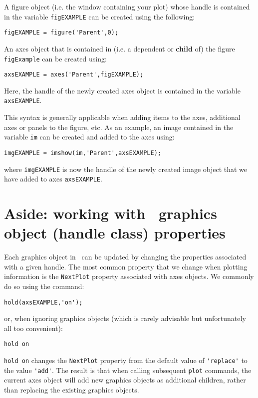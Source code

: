 \documentclass{tufte-handout}
\begin{document}
A figure object (i.e. the window containing your plot) whose handle is contained in the variable \lstinline{figEXAMPLE} can be created using the following:
\begin{lstlisting}[style=usnaMatlab]
figEXAMPLE = figure('Parent',0);
\end{lstlisting}

An axes object that is contained in (i.e. a dependent or \textbf{child} of) the figure \lstinline{figExample} can be created using:
\begin{lstlisting}[style=usnaMatlab]
axsEXAMPLE = axes('Parent',figEXAMPLE);
\end{lstlisting}

Here, the handle of the newly created axes object is contained in the variable \lstinline{axsEXAMPLE}. 

This syntax is generally applicable when adding items to the axes, additional axes or panels to the figure, etc. As an example, an image contained in the variable \lstinline{im} can be created and added to the axes using:
\begin{lstlisting}[style=usnaMatlab]
imgEXAMPLE = imshow(im,'Parent',axsEXAMPLE);
\end{lstlisting}
where \lstinline{imgEXAMPLE} is now the handle of the newly created image object that we have added to axes \lstinline{axsEXAMPLE}. 

\section{Aside: working with \Matlab\ graphics object (handle class) properties}
Each graphics object in \Matlab\ can be updated by changing the properties associated with a given handle. The most common property that we change when plotting information is the \lstinline{NextPlot} property associated with axes objects. We commonly do so using the command:
\begin{lstlisting}[style=usnaMatlab]
hold(axsEXAMPLE,'on');
\end{lstlisting}
or, when ignoring graphics objects (which is rarely advisable but unfortunately all too convenient):
\begin{lstlisting}[style=usnaMatlab]
hold on
\end{lstlisting}
\lstinline{hold on} changes the \lstinline{NextPlot} property from the default value of \lstinline{'replace'} to the value \lstinline{'add'}. The result is that when calling subsequent \lstinline{plot} commands, the current axes object will add new graphics objects as additional children, rather than replacing the existing graphics objects. 
\end{document}
